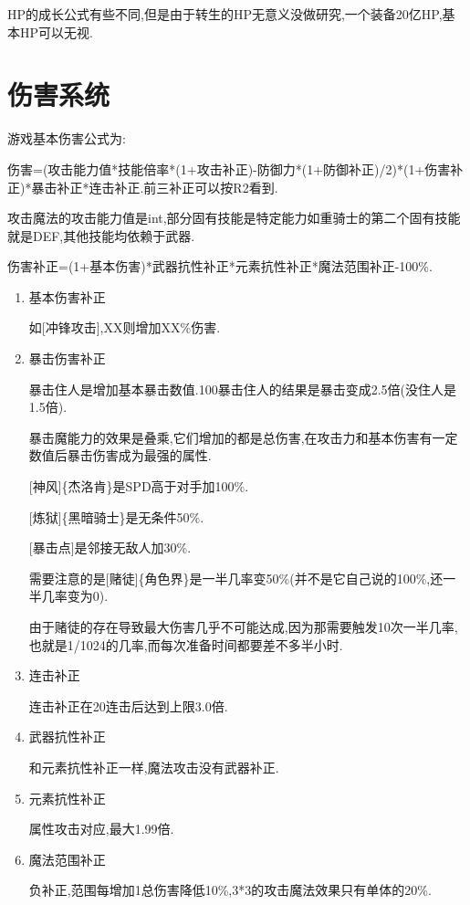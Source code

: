 	HP的成长公式有些不同,但是由于转生的HP无意义没做研究,一个装备20亿HP,基本HP可以无视.

	\newpage

	\section{伤害系统}
	
	游戏基本伤害公式为:

	伤害=(攻击能力值*技能倍率*(1+攻击补正)-防御力*(1+防御补正)/2)*(1+伤害补正)*暴击补正*连击补正.前三补正可以按R2看到.

	攻击魔法的攻击能力值是int,部分固有技能是特定能力如重骑士的第二个固有技能就是DEF,其他技能均依赖于武器.

	伤害补正=(1+基本伤害)*武器抗性补正*元素抗性补正*魔法范围补正-100\%.

	\begin{enumerate}

		\item 基本伤害补正

		如[冲锋攻击],XX则增加XX\%伤害.

		\item 暴击伤害补正

		暴击住人是增加基本暴击数值.100暴击住人的结果是暴击变成2.5倍(没住人是1.5倍).

		暴击魔能力的效果是叠乘,它们增加的都是总伤害,在攻击力和基本伤害有一定数值后暴击伤害成为最强的属性.

		[神风]\{杰洛肯\}是SPD高于对手加100\%.

		[炼狱]\{黑暗骑士\}是无条件50\%.

		[暴击点]是邻接无敌人加30\%.

		需要注意的是[赌徒]\{角色界\}是一半几率变50\%(并不是它自己说的100\%,还一半几率变为0).

		由于赌徒的存在导致最大伤害几乎不可能达成,因为那需要触发10次一半几率,也就是1/1024的几率,而每次准备时间都要差不多半小时.

		\item 连击补正
		
		连击补正在20连击后达到上限3.0倍.

		\item 武器抗性补正

		和元素抗性补正一样,魔法攻击没有武器补正.

		\item 元素抗性补正
		
		属性攻击对应,最大1.99倍.

		\item 魔法范围补正
		
		负补正,范围每增加1总伤害降低10\%,3*3的攻击魔法效果只有单体的20\%.

	\end{enumerate}


